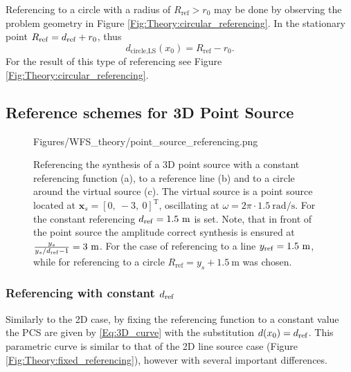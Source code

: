 Referencing to a circle with a radius of $R_{\mathrm{ref}} > r_0$ may be done by observing the problem geometry in Figure \ref{Fig:Theory:circular_referencing}. 
In the stationary point $R_{\mathrm{ref}} = d_{\mathrm{ref}} + r_0$, thus
%
\begin{equation}
d_\text{circle,LS}(x_0) = R_{\mathrm{ref}} - r_0.
\label{Eq:dCircleLS}
\end{equation}
%
For the result of this type of referencing see Figure \ref{Fig:Theory:circular_referencing}.


\subsection{Reference schemes for 3D Point Source}

\begin{figure}
	\centering
	\begin{overpic}[width = .85\columnwidth ]{Figures/WFS_theory/point_source_referencing.png}
	\scriptsize
	\end{overpic}
\caption{Referencing the synthesis of a 3D point source with a constant referencing function (a), to a reference line (b) and to a circle around the virtual source (c). The virtual source is a point source located at $\mathbf{x}_s = [0,\ -3,\ 0]^\mathrm{T}$, oscillating at $\omega = 2\pi \cdot 1.5 ~\mathrm{rad/s}$. For the constant referencing $d_{\mathrm{ref}} = 1.5~\mathrm{m}$ is set. Note, that in front of the point source the amplitude correct synthesis is ensured at $\frac{y_s}{y_s/d_{\mathrm{ref}} - 1 } = 3~\mathrm{m}$. For the case of referencing to a line $y_{\mathrm{ref}} = 1.5~\mathrm{m}$, while for referencing to a circle $R_{\mathrm{ref}} = y_s + 1.5~\mathrm{m}$ was chosen.}
	\label{Fig:Theory:point_source_referencing}
\end{figure}

\subsubsection[Referencing with constant dref]{Referencing with constant $d_{\mathrm{ref}}$}

Similarly to the 2D case, by fixing the referencing function to a constant value the PCS are given by \eqref{Eq:3D_curve} with the substitution $d(x_0) = d_{\mathrm{ref}}$.
This parametric curve is similar to that of the 2D line source case (Figure \ref{Fig:Theory:fixed_referencing}), however with several important differences.

